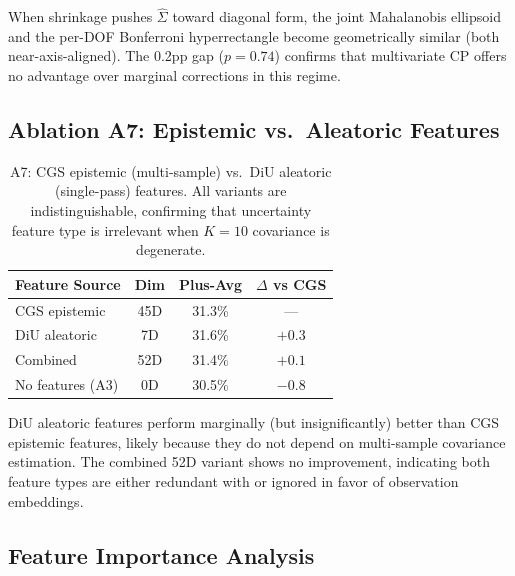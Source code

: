\documentclass[letterpaper]{article}
\begin{document}
When shrinkage pushes $\hat{\Sigma}$ toward diagonal form, the joint Mahalanobis ellipsoid and the per-DOF Bonferroni hyperrectangle become geometrically similar (both near-axis-aligned). The 0.2pp gap ($p{=}0.74$) confirms that multivariate CP offers no advantage over marginal corrections in this regime.

\subsection{Ablation A7: Epistemic vs.\ Aleatoric Features}
\label{sec:exp-a7}

\begin{table}[h]
\centering
\caption{A7: CGS epistemic (multi-sample) vs.\ DiU aleatoric (single-pass) features. All variants are indistinguishable, confirming that uncertainty feature type is irrelevant when $K{=}10$ covariance is degenerate.}
\label{tab:a7}
\begin{tabular}{lccc}
\toprule
Feature Source & Dim & Plus-Avg & $\Delta$ vs CGS \\
\midrule
CGS epistemic & 45D & 31.3\% & --- \\
DiU aleatoric & 7D & 31.6\% & $+0.3$ \\
Combined & 52D & 31.4\% & $+0.1$ \\
No features (A3) & 0D & 30.5\% & $-0.8$ \\
\bottomrule
\end{tabular}
\end{table}

DiU aleatoric features perform marginally (but insignificantly) better than CGS epistemic features, likely because they do not depend on multi-sample covariance estimation. The combined 52D variant shows no improvement, indicating both feature types are either redundant with or ignored in favor of observation embeddings.

\subsection{Feature Importance Analysis}
\label{sec:exp-feature}
\end{document}
